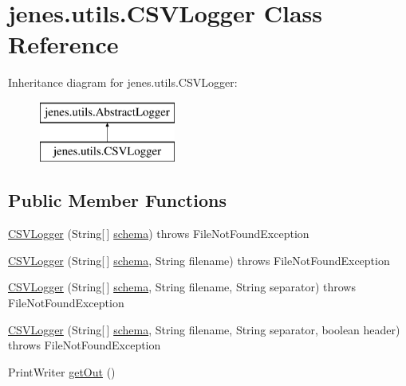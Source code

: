 \hypertarget{classjenes_1_1utils_1_1_c_s_v_logger}{\section{jenes.\-utils.\-C\-S\-V\-Logger Class Reference}
\label{classjenes_1_1utils_1_1_c_s_v_logger}
}
Inheritance diagram for jenes.\-utils.\-C\-S\-V\-Logger\-:\begin{figure}[H]
\begin{center}
\leavevmode
\includegraphics[height=2.000000cm]{classjenes_1_1utils_1_1_c_s_v_logger}
\end{center}
\end{figure}
\subsection*{Public Member Functions}
\begin{DoxyCompactItemize}
\item 
\hyperlink{classjenes_1_1utils_1_1_c_s_v_logger_a8cac9e217f74d86b4e26b025d8e1381c}{C\-S\-V\-Logger} (String\mbox{[}$\,$\mbox{]} \hyperlink{classjenes_1_1utils_1_1_abstract_logger_a3a2030876857a0512fae7e0ad400c570}{schema})  throws File\-Not\-Found\-Exception 
\item 
\hyperlink{classjenes_1_1utils_1_1_c_s_v_logger_a52ccc76492a8a16e018198bcfa702360}{C\-S\-V\-Logger} (String\mbox{[}$\,$\mbox{]} \hyperlink{classjenes_1_1utils_1_1_abstract_logger_a3a2030876857a0512fae7e0ad400c570}{schema}, String filename)  throws File\-Not\-Found\-Exception 
\item 
\hyperlink{classjenes_1_1utils_1_1_c_s_v_logger_ad6242d77cf75372bfbf55e9b0973bfb4}{C\-S\-V\-Logger} (String\mbox{[}$\,$\mbox{]} \hyperlink{classjenes_1_1utils_1_1_abstract_logger_a3a2030876857a0512fae7e0ad400c570}{schema}, String filename, String separator)  throws File\-Not\-Found\-Exception 
\item 
\hyperlink{classjenes_1_1utils_1_1_c_s_v_logger_ad39241223c9d49bfa34a21db4aa1f8b1}{C\-S\-V\-Logger} (String\mbox{[}$\,$\mbox{]} \hyperlink{classjenes_1_1utils_1_1_abstract_logger_a3a2030876857a0512fae7e0ad400c570}{schema}, String filename, String separator, boolean header)  throws File\-Not\-Found\-Exception 
\item 
Print\-Writer \hyperlink{classjenes_1_1utils_1_1_c_s_v_logger_a00671f9154ae65398d676e6526fa08f2}{get\-Out} ()
\end{DoxyCompactItemize}
